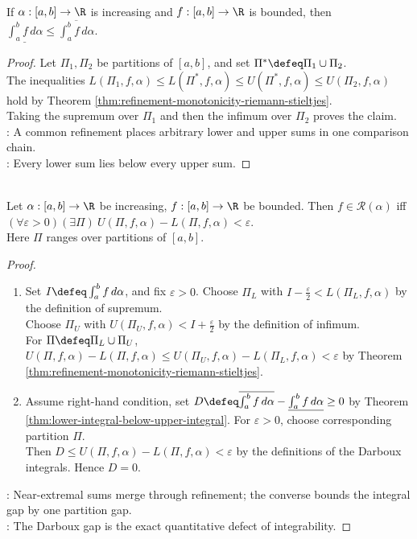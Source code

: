 \begin{theorem} \label{thm:lower-integral-below-upper-integral} \\
If $\alpha:[a,b]\to\R$ is increasing and $f:[a,b]\to\R$ is bounded, then $\underline{\int_a^b f\,d\alpha}\leq\overline{\int_a^b f\,d\alpha}$.
\begin{proof}
Let $\Pi_1,\Pi_2$ be partitions of $[a,b]$, and set $\Pi^\ast\defeq\Pi_1\cup\Pi_2$.\\
The inequalities $L(\Pi_1,f,\alpha)\leq L(\Pi^\ast,f,\alpha)\leq U(\Pi^\ast,f,\alpha)\leq U(\Pi_2,f,\alpha)$ hold by Theorem \ref{thm:refinement-monotonicity-riemann-stieltjes}.\\
Taking the supremum over $\Pi_1$ and then the infimum over $\Pi_2$ proves the claim.\\
: A common refinement places arbitrary lower and upper sums in one comparison chain.\\
: Every lower sum lies below every upper sum.
\end{proof}
\end{theorem}

\begin{theorem} \label{thm:riemann-stieltjes-integrability-criterion} \\
Let $\alpha:[a,b]\to\R$ be increasing, $f:[a,b]\to\R$ be bounded. Then $f\in\mathcal{R}(\alpha)$ iff $(\forall\varepsilon>0)(\exists\Pi)\ U(\Pi,f,\alpha)-L(\Pi,f,\alpha)<\varepsilon$.\\
Here $\Pi$ ranges over partitions of $[a,b]$.
\begin{proof}
\begin{enumerate}[label=\roman*.]
\setlength{\itemsep}{0pt}
\item[$(\Rightarrow)$] Set $I\defeq\int_a^b f\,d\alpha$, and fix $\varepsilon>0$. Choose $\Pi_L$ with $I-\frac{\varepsilon}{2}<L(\Pi_L,f,\alpha)$ by the definition of supremum.\\
Choose $\Pi_U$ with $U(\Pi_U,f,\alpha)<I+\frac{\varepsilon}{2}$ by the definition of infimum.\\
For $\Pi\defeq\Pi_L\cup\Pi_U$, $U(\Pi,f,\alpha)-L(\Pi,f,\alpha)\leq U(\Pi_U,f,\alpha)-L(\Pi_L,f,\alpha)<\varepsilon$ by Theorem \ref{thm:refinement-monotonicity-riemann-stieltjes}.
\item[$(\Leftarrow)$] Assume right-hand condition, set $D\defeq\overline{\int_a^b f\,d\alpha}-\underline{\int_a^b f\,d\alpha}\geq0$ by Theorem \ref{thm:lower-integral-below-upper-integral}. For $\varepsilon>0$, choose corresponding partition $\Pi$.\\
Then $D\leq U(\Pi,f,\alpha)-L(\Pi,f,\alpha)<\varepsilon$ by the definitions of the Darboux integrals. Hence $D=0$.
\end{enumerate}
: Near-extremal sums merge through refinement; the converse bounds the integral gap by one partition gap.\\
: The Darboux gap is the exact quantitative defect of integrability.
\end{proof}
\end{theorem}

